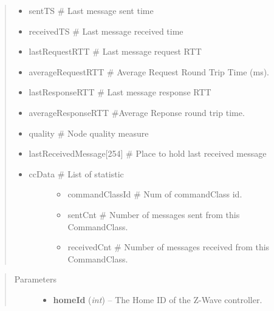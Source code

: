 \documentclass[letterpaper,10pt,english]{sphinxmanual}
\begin{document}
\begin{fulllineitems}
\begin{fulllineitems}
\begin{quote}
\begin{description}
\begin{itemize}
\item {} 
sentTS                                \# Last message sent time

\item {} 
receivedTS                          \# Last message received time

\item {} 
lastRequestRTT                    \# Last message request RTT

\item {} 
averageRequestRTT             \# Average Request Round Trip Time (ms).

\item {} 
lastResponseRTT                  \# Last message response RTT

\item {} 
averageResponseRTT           \#Average Reponse round trip time.

\item {} 
quality                                \# Node quality measure

\item {} 
lastReceivedMessage{[}254{]}   \# Place to hold last received message

\item {} \begin{description}
\item[{ccData                                \# List of statistic}] \leavevmode\begin{itemize}
\item {} 
commandClassId               \# Num of commandClass id.

\item {} 
sentCnt                             \# Number of messages sent from this CommandClass.

\item {} 
receivedCnt                       \# Number of messages received from this CommandClass.

\end{itemize}

\end{description}

\end{itemize}

\end{description}
\end{quote}
\begin{quote}\begin{description}
\item[{Parameters}] \leavevmode\begin{itemize}
\item {} 
\textbf{homeId} (\emph{int}) -- The Home ID of the Z-Wave controller.


\end{itemize}
\end{description}
\end{quote}
\end{fulllineitems}
\end{fulllineitems}
\end{document}
